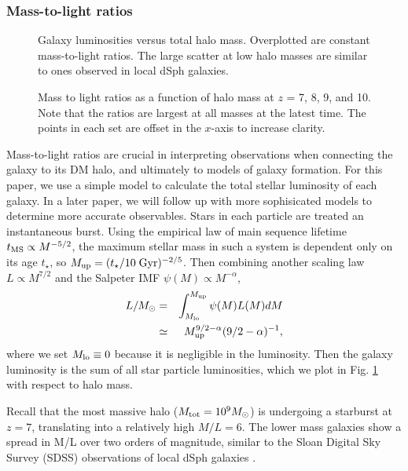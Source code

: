 \documentclass[useAMS,usenatbib]{mn2e}
\begin{document}
\subsubsection{Mass-to-light ratios}
\label{sec:mlratios}

\begin{figure}
  \caption{\label{fig:Lstar} Galaxy luminosities versus total halo
    mass.  Overplotted are constant mass-to-light ratios.  The large
    scatter at low halo masses are similar to ones observed in local
    dSph galaxies.}
\end{figure}

\begin{figure}
  \caption{\label{fig:ML} Mass to light ratios as a function of halo
    mass at $z$ = 7, 8, 9, and 10.  Note that the ratios are largest
    at all masses at the latest time.  The points in each set are
    offset in the $x$-axis to increase clarity.}
\end{figure}

Mass-to-light ratios are crucial in interpreting observations when
connecting the galaxy to its DM halo, and ultimately to models of
galaxy formation.  For this paper, we use a simple model to calculate
the total stellar luminosity of each galaxy.  In a later paper, we
will follow up with more sophisicated models to determine more
accurate observables.  Stars in each particle are treated an
instantaneous burst.  Using the empirical law of main sequence
lifetime $t_{\rm MS} \propto M^{-5/2}$, the maximum stellar mass in
such a system is dependent only on its age $t_\star$, so $M_{\rm up} =
(t_\star / 10\;\mathrm{Gyr})^{-2/5}$.  Then combining another scaling
law $L \propto M^{7/2}$ and the Salpeter IMF $\psi(M) \propto
M^{-\alpha}$,
%
\begin{eqnarray}
  \label{eqn:lum}
  L/M_\odot &=& \int_{M_{\rm lo}}^{M_{\rm up}} \psi(M) L(M) dM \nonumber\\
      &\simeq& M_{\rm up}^{9/2-\alpha} (9/2 - \alpha)^{-1},
\end{eqnarray}
where we set $M_{\rm lo} \equiv 0$ because it is negligible in the
luminosity.  Then the galaxy luminosity is the sum of all star
particle luminosities, which we plot in Fig. \ref{fig:Lstar} with
respect to halo mass.  

Recall that the most massive halo ($M_{\rm tot} = 10^9 \Ms$) is
undergoing a starburst at $z=7$, translating into a relatively high
$M/L = 6$.  The lower mass galaxies show a spread in M/L over two
orders of magnitude, similar to the Sloan Digital Sky Survey (SDSS)
observations of local dSph galaxies \citep[e.g.][]{Strigari08}.  
\end{document}
